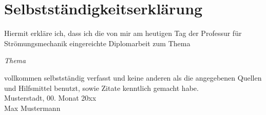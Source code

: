 \cleardoublepage
\chapter*{Selbstständigkeitserklärung}
\thispagestyle{empty}
Hiermit erkläre ich, dass ich die von mir am heutigen Tag der Professur für Strömungsmechanik eingereichte 
Diplomarbeit
zum Thema 
\begin{center}
\textit{Thema}
\end{center}
vollkommen selbstständig verfasst und keine anderen als die angegebenen Quellen und Hilfsmittel benutzt, sowie Zitate kenntlich gemacht habe.
\\[10mm]
Musterstadt, 00. Monat 20xx \\[1cm]
Max Mustermann
